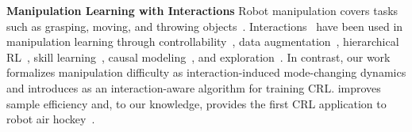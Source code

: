 
\textbf{Manipulation Learning with Interactions} 
Robot manipulation covers tasks such as grasping, moving, and throwing objects~\citep{han2023survey}. Interactions~\citep{chuck2024automated} have been used in manipulation learning through controllability~\citep{seitzer2021causal}, data augmentation~\citep{pitis2020counterfactual,pitis2022mocoda}, hierarchical RL~\citep{chuck2020hypothesis,chuck2023granger,wang2024skild}, skill learning~\citep{hu2024disentangled,rodriguez2025pixels,hosseini2026susd}, causal modeling~\citep{lee2023scale,biswas2024gaze}, and exploration~\citep{wang2023elden}. In contrast, our work formalizes manipulation difficulty as interaction-induced mode-changing dynamics and introduces \methodshort{} as an interaction-aware algorithm for training CRL. \methodshort{} improves sample efficiency and, to our knowledge, provides the first CRL application to robot air hockey~\citep{chuck2024air}.